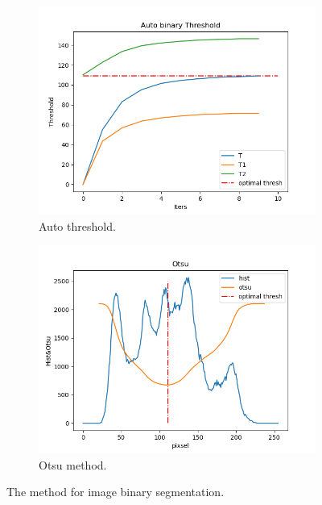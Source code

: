 \documentclass{article}
\begin{document}
\begin{figure}[htb!] %
  \centering
  \begin{subfigure}[b]{0.45\linewidth}
    \includegraphics[width=\linewidth]{autoThres.png}
    \caption{Auto threshold.}
  \end{subfigure}
  \begin{subfigure}[b]{0.45\linewidth}
    \includegraphics[width=\linewidth]{otsu.png}
    \caption{Otsu method.}
  \end{subfigure}
  \caption{The method for image binary segmentation.}
  \label{fig:imageSeg}
\end{figure}
\end{document}
